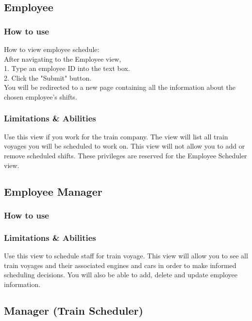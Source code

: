 \documentclass[letter]{article}
\begin{document}
\subsection{Employee}
\subsubsection{How to use}
How to view employee schedule:\\
After navigating to the Employee view,\\ 
1. Type an employee ID into the text box.\\
2. Click the "Submit" button. \\
You will be redirected to a new page containing all the information about the chosen employee's shifts.\\


\subsubsection{Limitations \& Abilities}
Use this view if you work for the train company. The view will list all train voyages you will be scheduled to work on.  This view will not allow you to add or remove scheduled shifts. These privileges are reserved for the Employee Scheduler view.


\subsection{Employee Manager}
\subsubsection{How to use}


\subsubsection{Limitations \& Abilities}
Use this view to schedule staff for train voyage. This view will allow you to see all train voyages and their associated engines and cars in order to make informed scheduling decisions. You will also be able to add, delete and update employee information.


\subsection{Manager (Train Scheduler)}
\end{document}
